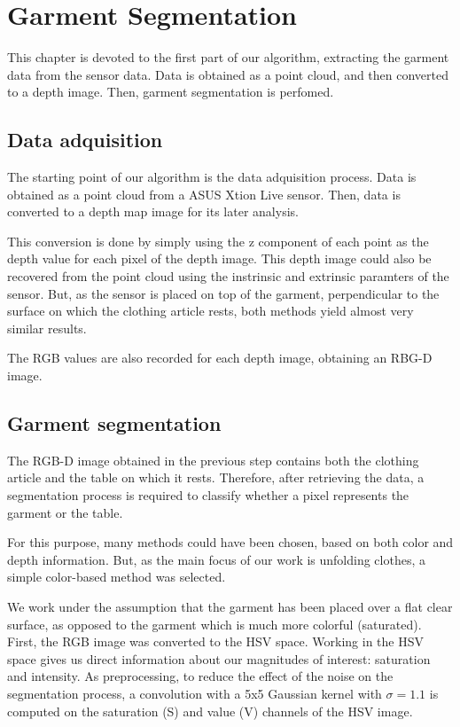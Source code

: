 \chapter{Garment Segmentation}

This chapter is devoted to the first part of our algorithm, extracting the garment data from the sensor data. Data is obtained as a point cloud, and then converted to a depth image. Then, garment segmentation is perfomed.

\section{Data adquisition}
The starting point of our algorithm is the data adquisition process. Data is obtained as a point cloud from a ASUS Xtion Live sensor. Then, data is converted to a depth map image for its later analysis. 

This conversion is done by simply using the z component of each point as the depth value for each pixel of the depth image. This depth image could also be recovered from the point cloud using the instrinsic and extrinsic paramters of the sensor. But, as the sensor is placed on top of the garment, perpendicular to the surface on which the clothing article rests, both methods yield almost very similar results.


The RGB values are also recorded for each depth image, obtaining an RBG-D image.

\section{Garment segmentation}
The RGB-D image obtained in the previous step contains both the clothing article and the table on which it rests. Therefore, after retrieving the data, a segmentation process is required to classify whether a pixel represents the garment or the table.

For this purpose, many methods could have been chosen, based on both color and depth information. But, as the main focus of our work is unfolding clothes, a simple color-based method was selected. 

We work under the assumption that the garment has been placed over a flat clear surface, as opposed to the garment which is much more colorful (saturated). First, the RGB image was converted to the HSV space. Working in the HSV space gives us direct information about our magnitudes of interest: saturation and intensity. As preprocessing, to reduce the effect of the noise on the segmentation process, a convolution with a 5x5 Gaussian kernel with $\sigma=1.1$ is computed on the saturation (S) and value (V) channels of the HSV image.

